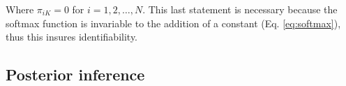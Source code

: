 \documentclass[12pt,letterpaper]{article}
\begin{document}
Where \(\pi_{iK} = 0\) for \(i = 1, 2, \dots, N\). This last statement is necessary because the softmax function is invariable to the addition of a constant (Eq. \ref{eq:softmax}), thus this insures identifiability.


\subsection{Posterior inference}


\end{document}
